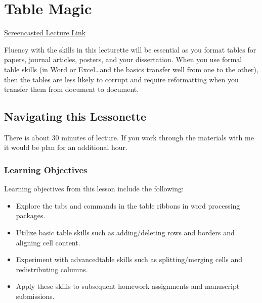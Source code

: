 \documentclass[
  english,
]{book}
\providecommand{\tightlist}{%
  \setlength{\itemsep}{0pt}\setlength{\parskip}{0pt}}
\begin{document}
\hypertarget{Tables}{%
\chapter{Table Magic}\label{Tables}}

\href{https://spu.hosted.panopto.com/Panopto/Pages/Viewer.aspx?pid=5f6035f2-0aff-476b-829c-ac240184c580}{Screencasted Lecture Link}

Fluency with the skills in this lecturette will be essential as you format tables for papers, journal articles, posters, and your dissertation. When you use formal table skills (in Word or Excel\ldots and the basics transfer well from one to the other), then the tables are less likely to corrupt and require reformatting when you transfer them from document to document.

\hypertarget{navigating-this-lessonette-1}{%
\section{Navigating this Lessonette}\label{navigating-this-lessonette-1}}

There is about 30 minutes of lecture. If you work through the materials with me it would be plan for an additional hour.

\hypertarget{learning-objectives-10}{%
\subsection{Learning Objectives}\label{learning-objectives-10}}

Learning objectives from this lesson include the following:

\begin{itemize}
\tightlist
\item
  Explore the tabs and commands in the table ribbons in word processing packages.
\item
  Utilize basic table skills such as adding/deleting rows and borders and aligning cell content.
\item
  Experiment with advancedtable skills such as splitting/merging cells and redistributing columns.
\item
  Apply these skills to subsequent homework assignments and manuscript submissions.
\end{itemize}
\end{document}

